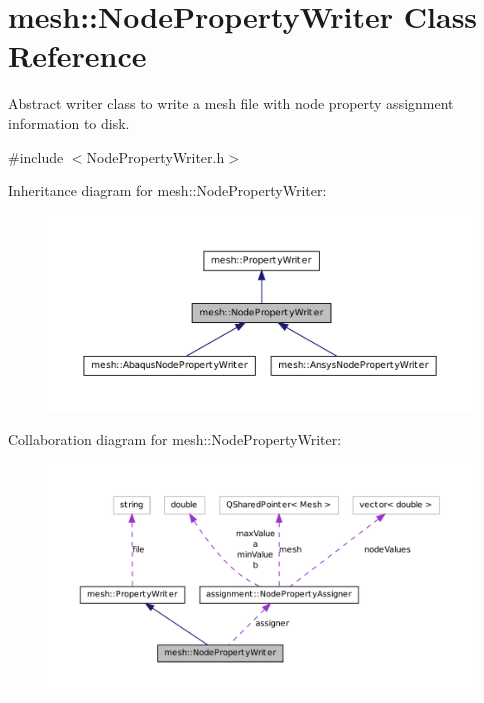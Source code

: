 \hypertarget{classmesh_1_1_node_property_writer}{
\section{mesh::NodePropertyWriter Class Reference}
\label{classmesh_1_1_node_property_writer}
}


Abstract writer class to write a mesh file with node property assignment information to disk.  




{\ttfamily \#include $<$NodePropertyWriter.h$>$}



Inheritance diagram for mesh::NodePropertyWriter:\nopagebreak
\begin{figure}[H]
\begin{center}
\leavevmode
\includegraphics[width=400pt]{classmesh_1_1_node_property_writer__inherit__graph}
\end{center}
\end{figure}


Collaboration diagram for mesh::NodePropertyWriter:\nopagebreak
\begin{figure}[H]
\begin{center}
\leavevmode
\includegraphics[width=400pt]{classmesh_1_1_node_property_writer__coll__graph}
\end{center}
\end{figure}
